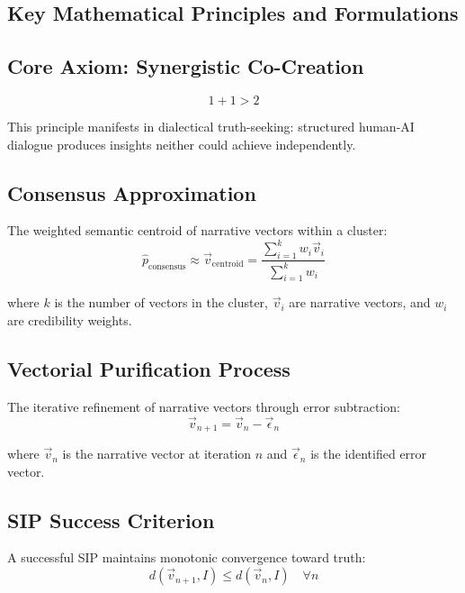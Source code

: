 \documentclass[11pt,a4paper]{article}
\begin{document}
\begin{small}
\vspace{1cm}

\section*{Key Mathematical Principles and Formulations}

\subsection*{Core Axiom: Synergistic Co-Creation}
\begin{equation}
1 + 1 > 2
\label{eq:synergy}
\end{equation}

\noindent This principle manifests in dialectical truth-seeking: structured human-AI dialogue produces insights neither could achieve independently.

\subsection*{Consensus Approximation}
The weighted semantic centroid of narrative vectors within a cluster:
\begin{equation}
\hat{p}_{\text{consensus}} \approx \vec{v}_{\text{centroid}} = \frac{\sum_{i=1}^{k}w_{i}\vec{v}_{i}}{\sum_{i=1}^{k}w_{i}}
\label{eq:consensus}
\end{equation}

where $k$ is the number of vectors in the cluster, $\vec{v}_i$ are narrative vectors, and $w_i$ are credibility weights.

\subsection*{Vectorial Purification Process}
The iterative refinement of narrative vectors through error subtraction:
\begin{equation}
\vec{v}_{n+1} = \vec{v}_{n} - \vec{\epsilon}_{n}
\label{eq:purification}
\end{equation}

where $\vec{v}_n$ is the narrative vector at iteration $n$ and $\vec{\epsilon}_n$ is the identified error vector.

\subsection*{SIP Success Criterion}
A successful SIP maintains monotonic convergence toward truth:
\begin{equation}
d(\vec{v}_{n+1}, I) \leq d(\vec{v}_{n}, I) \quad \forall n
\label{eq:convergence}
\end{equation}


\end{small}
\end{document}
